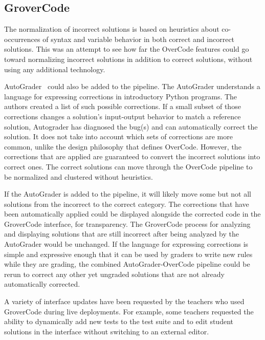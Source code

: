 
\subsection{GroverCode}

The normalization of incorrect solutions is based on heuristics about co-occurrences of syntax and variable behavior in both correct and incorrect solutions. This was an attempt to see how far the OverCode features could go toward normalizing incorrect solutions in addition to correct solutions, without using any additional technology. 

AutoGrader~\cite{autograder} could also be added to the pipeline. The AutoGrader understands a language for expressing corrections in introductory Python programs. The authors created a list of such possible corrections. If a small subset of those corrections changes a solution's input-output behavior to match a reference solution, Autograder has diagnosed the bug(s) and can automatically correct the solution. It does not take into account which sets of corrections are more common, unlike the design philosophy that defines OverCode. However, the corrections that are applied are guaranteed to convert the incorrect solutions into correct ones. The correct solutions can move through the OverCode pipeline to be normalized and clustered without heuristics. 

If the AutoGrader is added to the pipeline, it will likely move some but not all solutions from the incorrect to the correct category. The corrections that have been automatically applied could be displayed alongside the corrected code in the GroverCode interface, for transparency. The GroverCode process for analyzing and displaying solutions that are still incorrect after being analyzed by the AutoGrader would be unchanged. If the language for expressing corrections is simple and expressive enough that it can be used by graders to write new rules while they are grading, the combined AutoGrader-OverCode pipeline could be rerun to correct any other yet ungraded solutions that are not already automatically corrected. 

A variety of interface updates have been requested by the teachers who used GroverCode during live deployments. For example, some teachers requested the ability to dynamically add new tests to the test suite and to edit student solutions in the interface without switching to an external editor. %


